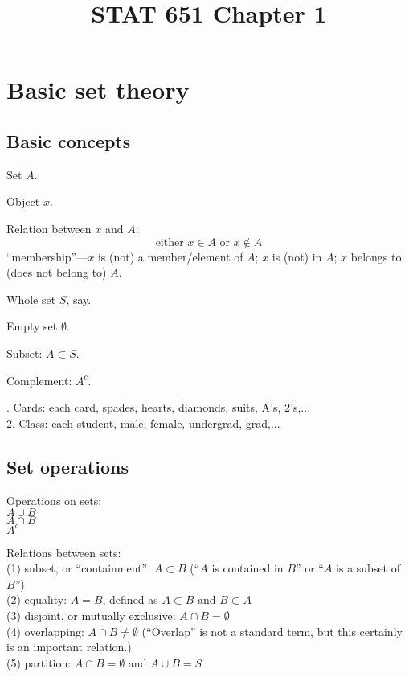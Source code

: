 \documentclass[12pt]{article}
\begin{document}
\title{STAT 651 Chapter 1}
\maketitle

\section{Basic set theory}

\subsection*{Basic concepts}

Set $A$.

Object $x$.

Relation between $x$ and $A$:
\[\text{either $x \in A$ or $x \notin A$}\]
``membership''---$x$ is (not) a member/element of $A$;
$x$ is (not) in $A$; $x$ belongs to (does not belong to) $A$.

Whole set $S$, say.

Empty set $\emptyset$.

Subset: $A \subset S$.

Complement: $A^c$.

. Cards: each card, spades, hearts, diamonds, suits, A's, 2's,...\\
2. Class: each student, male, female, undergrad, grad,...

\subsection*{Set operations}

Operations on sets:\\
$A \cup B$\\
$A \cap B$\\
$A^c$

Relations between sets:\\[3pt]
(1) subset, or ``containment'': $A \subset B$
(``$A$ is contained in $B$'' or ``$A$ is a subset of $B$'')\\[3pt]
(2) equality: $A = B$, defined as
$A \subset B \text{ and } B \subset A$\\[3pt]
(3) disjoint, or mutually exclusive: $A \cap B = \emptyset$\\[3pt]
(4) overlapping: $A \cap B \ne \emptyset$
(``Overlap'' is not a standard term, but this certainly is
an important relation.)\\[3pt]
(5) partition: $A \cap B = \emptyset$ and $A \cup B = S$
\end{document}
